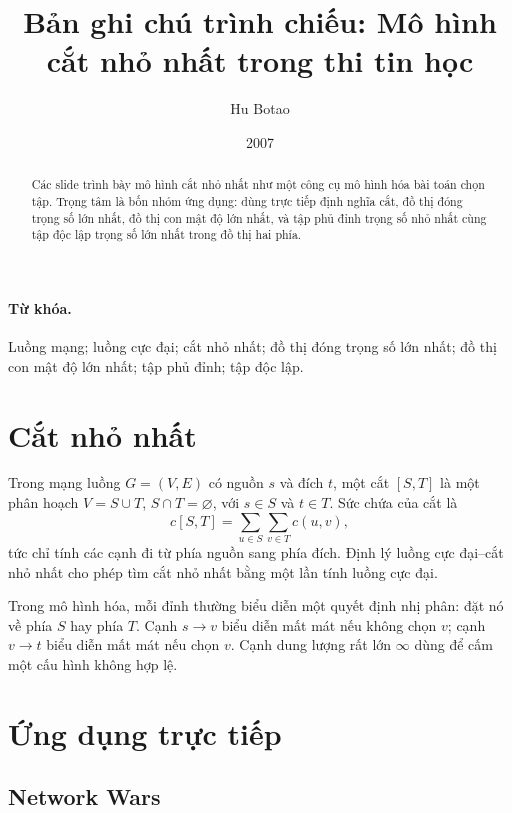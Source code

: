 \documentclass[11pt]{article}
\title{Bản ghi chú trình chiếu: Mô hình cắt nhỏ nhất trong thi tin học}
\author{Hu Botao}
\date{2007}
\newcommand{\INF}{\infty}
\begin{document}
\maketitle


\begin{abstract}
Các slide trình bày mô hình cắt nhỏ nhất như một công cụ mô hình hóa bài
toán chọn tập. Trọng tâm là bốn nhóm ứng dụng: dùng trực tiếp định nghĩa cắt,
đồ thị đóng trọng số lớn nhất, đồ thị con mật độ lớn nhất, và tập phủ đỉnh
trọng số nhỏ nhất cùng tập độc lập trọng số lớn nhất trong đồ thị hai phía.
\end{abstract}

\paragraph{Từ khóa.}
Luồng mạng; luồng cực đại; cắt nhỏ nhất; đồ thị đóng trọng số lớn nhất; đồ
thị con mật độ lớn nhất; tập phủ đỉnh; tập độc lập.

\section{Cắt nhỏ nhất}

Trong mạng luồng \(G=(V,E)\) có nguồn \(s\) và đích \(t\), một cắt
\([S,T]\) là một phân hoạch \(V=S\cup T\), \(S\cap T=\varnothing\), với
\(s\in S\) và \(t\in T\). Sức chứa của cắt là
\[
  c[S,T]=\sum_{u\in S}\sum_{v\in T}c(u,v),
\]
tức chỉ tính các cạnh đi từ phía nguồn sang phía đích. Định lý luồng cực
đại--cắt nhỏ nhất cho phép tìm cắt nhỏ nhất bằng một lần tính luồng cực đại.

Trong mô hình hóa, mỗi đỉnh thường biểu diễn một quyết định nhị phân: đặt nó
về phía \(S\) hay phía \(T\). Cạnh \(s\to v\) biểu diễn mất mát nếu không
chọn \(v\); cạnh \(v\to t\) biểu diễn mất mát nếu chọn \(v\). Cạnh dung lượng
rất lớn \(\INF\) dùng để cấm một cấu hình không hợp lệ.

\section{Ứng dụng trực tiếp}

\subsection{Network Wars}
\end{document}
